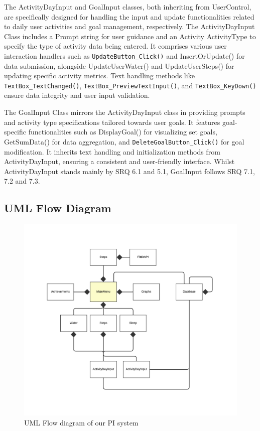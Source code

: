 \documentclass[12pt]{article}
\begin{document}
The ActivityDayInput and GoalInput classes, both inheriting from UserControl,
are specifically designed for handling the input and update functionalities
related to daily user activities and goal management, respectively. The
ActivityDayInput Class includes a Prompt string for user guidance and an
Activity ActivityType to specify the type of activity data being entered. It
comprises various user interaction handlers such as \texttt{UpdateButton\_Click()} and
InsertOrUpdate() for data submission, alongside UpdateUserWater() and
UpdateUserSteps() for updating specific activity metrics. Text handling methods
like \texttt{TextBox\_TextChanged()}, \texttt{TextBox\_PreviewTextInput()}, and
\texttt{TextBox\_KeyDown()} ensure data integrity and user input validation.\par

The GoalInput Class mirrors the ActivityDayInput class in providing prompts and
activity type specifications tailored towards user goals. It features
goal-specific functionalities such as DisplayGoal() for visualizing set goals,
GetSumData() for data aggregation, and \texttt{DeleteGoalButton\_Click()} for
goal modification. It inherits text handling and initialization methods from
ActivityDayInput, ensuring a consistent and user-friendly interface. Whilst
ActivityDayInput stands mainly by SRQ 6.1 and 5.1, GoalInput follows SRQ 7.1, 7.2 and 7.3.\par

\subsection{UML Flow Diagram}

\begin{figure}[!ht]
  \centering
  \includegraphics[width = 0.7\linewidth]{UML Flow diagram}
  \caption{UML Flow diagram of our PI system}
  \label{fig:flow}
\end{figure}
\end{document}
